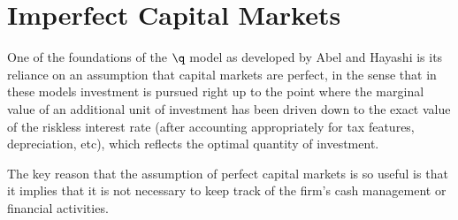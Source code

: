 \documentclass{handout}
\begin{document}

\section{Imperfect Capital Markets}

One of the foundations of the $\q$ model as developed by Abel and Hayashi 
is its reliance on an assumption that capital markets are perfect, in the sense
that in these models investment is pursued right up to the point where the 
marginal value of an additional unit of investment has been driven down 
to the exact value of the riskless interest rate (after accounting appropriately
for tax features, depreciation, etc), which reflects the optimal
quantity of investment.  

The key reason that the assumption of perfect capital markets is so useful
is that it implies that it is not necessary to keep track of the firm's 
cash management or financial activities.  
\end{document}
